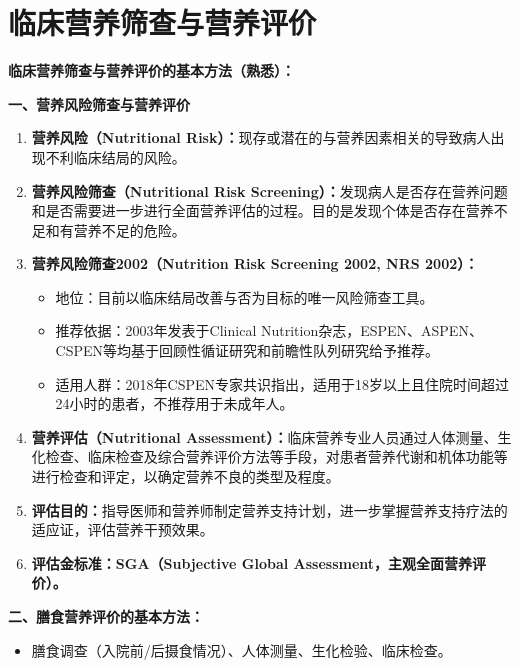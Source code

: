 \section{临床营养筛查与营养评价}

\begin{tipbox}
\textbf{临床营养筛查与营养评价的基本方法（熟悉）：}

\textbf{一、营养风险筛查与营养评价}

\begin{enumerate}[leftmargin=*]
    \item \textbf{营养风险（Nutritional Risk）：}现存或潜在的与营养因素相关的导致病人出现不利临床结局的风险。
    \item \textbf{营养风险筛查（Nutritional Risk Screening）：}发现病人是否存在营养问题和是否需要进一步进行全面营养评估的过程。目的是发现个体是否存在营养不足和有营养不足的危险。
    \item \textbf{营养风险筛查2002（Nutrition Risk Screening 2002, NRS 2002）：}
    \begin{itemize}[leftmargin=*]
        \item 地位：目前以临床结局改善与否为目标的唯一风险筛查工具。
        \item 推荐依据：2003年发表于Clinical Nutrition杂志，ESPEN、ASPEN、CSPEN等均基于回顾性循证研究和前瞻性队列研究给予推荐。
        \item 适用人群：2018年CSPEN专家共识指出，适用于18岁以上且住院时间超过24小时的患者，不推荐用于未成年人。
    \end{itemize}
    \item \textbf{营养评估（Nutritional Assessment）：}临床营养专业人员通过人体测量、生化检查、临床检查及综合营养评价方法等手段，对患者营养代谢和机体功能等进行检查和评定，以确定营养不良的类型及程度。
    \item \textbf{评估目的：}指导医师和营养师制定营养支持计划，进一步掌握营养支持疗法的适应证，评估营养干预效果。
    \item \textbf{评估金标准：SGA（Subjective Global Assessment，主观全面营养评价）。}
\end{enumerate}

\textbf{二、膳食营养评价的基本方法：}
\begin{itemize}[leftmargin=*]
    \item 膳食调查（入院前/后摄食情况）、人体测量、生化检验、临床检查。
\end{itemize}


\end{tipbox}
